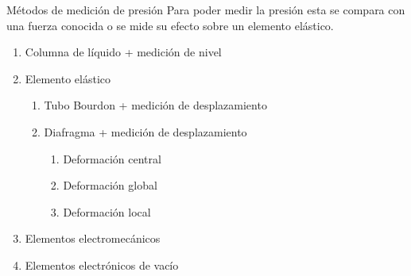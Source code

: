 \documentclass[aspectratio=169]{beamer}
\begin{document}
\begin{frame}{Métodos de medición de presión}
Para poder medir la presión esta se compara con una fuerza conocida o se mide su efecto sobre un elemento elástico.

\begin{enumerate}
    \item Columna de líquido + medición de nivel
    \item Elemento elástico
    \begin{enumerate}
        \item Tubo Bourdon + medición de desplazamiento
        \item Diafragma + medición de desplazamiento
        \begin{enumerate}
            \item Deformación central
            \item Deformación global
            \item Deformación local
        \end{enumerate}
    \end{enumerate}
    \item Elementos electromecánicos
    \item Elementos electrónicos de vacío
\end{enumerate}
\end{frame}
\end{document}
